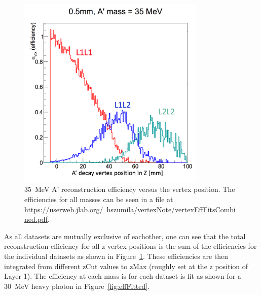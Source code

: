 \documentclass[twoside]{article}
\begin{document}
\begin{figure}[H]
  \centering
      \includegraphics[width=0.8\textwidth]{plots/35MeV_apEff.png}
  \caption{35~MeV A' reconstruction efficiency versus the vertex position. The efficiencies for all masses can be seen in a file at\\ \href{url}{https://userweb.jlab.org/~hszumila/vertexNote/vertexEffFitsCombined.pdf}.}
  \label{fig:apEff}
\end{figure} 

As all datasets are mutually exclusive of eachother, one can see that the total reconstruction efficiency for all z vertex positions is the sum of the efficiencies for the individual datasets as shown in Figure~\ref{fig:apEff}. These efficiencies are then integrated from different zCut values to zMax (roughly set at the z position of Layer 1). The efficiency at each mass is for each dataset is fit as shown for a 30~MeV heavy photon in Figure~\ref{fig:effFitted}.
\end{document}
